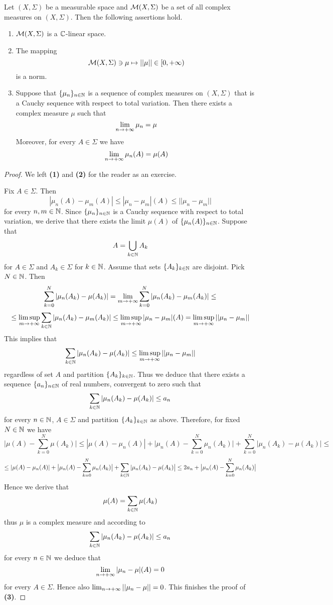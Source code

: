 \begin{theorem}\label{theorem:Banachspaceofmeasures}
    Let $(X,\Sigma)$ be a measurable space and ${\mathcal M}(X,\Sigma)$ be a set of all complex measures on $(X,\Sigma)$. Then the following assertions hold.
    \begin{enumerate}[label=\emph{\textbf{(\arabic*)}}, leftmargin=3.0em]
        \item ${\mathcal M}(X,\Sigma)$ is a ${\mathbb C}$-linear space.
        \item The mapping
              $${\mathcal M}(X,\Sigma)\ni \mu \mapsto ||\mu||\in [0,+\infty)$$
              is a norm.
        \item Suppose that $\{\mu_n\}_{n\in {\mathbb N}}$ is a sequence of complex measures on $(X,\Sigma)$ that is a Cauchy sequence with respect to total variation. Then there exists a complex measure $\mu$ such that
              $$\lim_{n\rightarrow +\infty}\mu_n = \mu$$
              Moreover, for every $A\in \Sigma$ we have
              $$\lim_{n\rightarrow +\infty}\mu_n(A) = \mu(A)$$
    \end{enumerate}
\end{theorem}
\begin{proof}
    We left \textbf{(1)} and \textbf{(2)} for the reader as an exercise. 
    
    Fix $A\in \Sigma$. Then
    $$|\mu_n(A) - \mu_m(A)| \leq |\mu_n - \mu_m|(A) \leq ||\mu_n - \mu_m||$$
    for every $n,m\in {\mathbb N}$. Since $\{\mu_n\}_{n\in {\mathbb N}}$ is a Cauchy sequence with respect to total variation, we derive that there exists the limit $\mu(A)$ of $\{\mu_n(A)\}_{n\in {\mathbb N}}$. Suppose that
    $$A = \bigcup_{k\in {\mathbb N}}A_k$$
    for $A\in \Sigma$ and $A_k\in \Sigma$ for $k\in {\mathbb N}$. Assume that sets $\{A_k\}_{k \in {\mathbb N}}$ are disjoint. Pick $N\in {\mathbb N}$. Then
    $$\sum_{k=0}^N|\mu_n(A_k) - \mu(A_k)| = \lim_{m\rightarrow +\infty}\sum_{k=0}^N|\mu_n(A_k) - \mu_m(A_k)| \leq$$
    $$\leq \limsup_{m\rightarrow +\infty}\sum_{k\in {\mathbb N}}|\mu_n(A_k) - \mu_m(A_k)|\leq \limsup_{m\rightarrow +\infty}|\mu_n - \mu_m|(A) = \limsup_{m\rightarrow +\infty}||\mu_n - \mu_m||$$
    This implies that
    $$\sum_{k\in {\mathbb N}}|\mu_n(A_k) - \mu(A_k)| \leq  \limsup_{m\rightarrow +\infty}||\mu_n - \mu_m||$$
    regardless of set $A$ and partition $\{A_k\}_{k\in {\mathbb N}}$. Thus we deduce that there exists a sequence $\{a_n\}_{n\in {\mathbb N}}$ of real numbers, convergent to zero such that
    $$\sum_{k\in {\mathbb N}}|\mu_n(A_k) - \mu(A_k)| \leq a_n$$
    for every $n\in {\mathbb N}$, $A\in \Sigma$ and partition $\{A_k\}_{k\in {\mathbb N}}$ as above. Therefore, for fixed $N\in {\mathbb N}$ we have
    $$\big|\mu(A) - \sum_{k=0}^N\mu(A_k)\big| \leq |\mu(A) - \mu_n(A)| + \big|\mu_n(A) - \sum_{k=0}^N\mu_n(A_k)\big| + \sum_{k=0}^N |\mu_n(A_k) - \mu(A_k)\big| \leq $$
    $$\leq |\mu(A) - \mu_n(A)| + \big|\mu_n(A) - \sum_{k=0}^N\mu_n(A_k)\big| + \sum_{k\in {\mathbb N}} |\mu_n(A_k) - \mu(A_k)\big| \leq  2a_n +  \big|\mu_n(A) - \sum_{k=0}^N\mu_n(A_k)\big|$$
    Hence we derive that
    $$\mu(A) = \sum_{k\in {\mathbb N}}\mu(A_k)$$
    thus $\mu$ is a complex measure and according to
    $$\sum_{k\in {\mathbb N}}|\mu_n(A_k) - \mu(A_k)| \leq a_n$$
    for every $n\in {\mathbb N}$ we deduce that
    $$\lim_{n\rightarrow +\infty}|\mu_n - \mu|(A) = 0$$
    for every $A\in \Sigma$. Hence also $\lim_{n\rightarrow +\infty}||\mu_n-\mu|| = 0$. This finishes the proof of \textbf{(3)}.
\end{proof}

